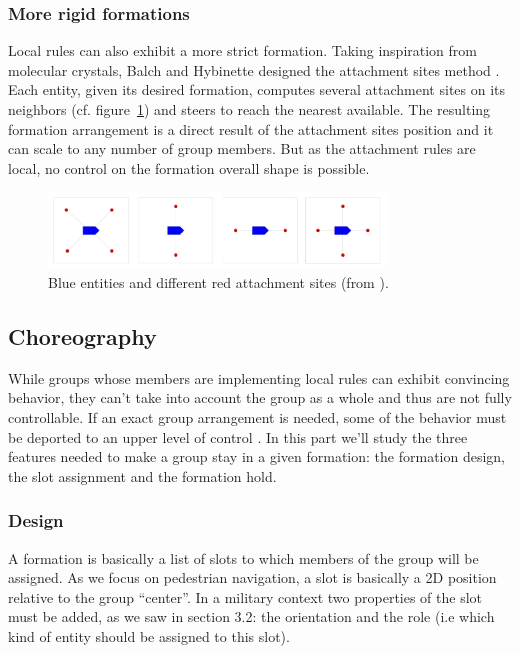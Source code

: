 \documentclass{article}
\begin{document}
\subsubsection{More rigid formations}
Local rules can also exhibit a more strict formation. Taking inspiration from molecular crystals, Balch and Hybinette designed the attachment sites method \cite{Balch:2000bn}. Each entity, given its desired formation, computes several attachment sites on its neighbors (cf. figure~\ref{fig:attachment_sites}) and steers to reach the nearest available. The resulting formation arrangement is a direct result of the attachment sites position and it can scale to any number of group members. But as the attachment rules are local, no control on the formation overall shape is possible. 

\begin{figure}[htb]
\centering
\includegraphics[width=0.8\textwidth]{AttachmentSites.jpg}
\caption{Blue entities and different red attachment sites (from \cite{Balch:2000bn}).}
\label{fig:attachment_sites}
\end{figure} 

\subsection{Choreography}

While groups whose members are implementing local rules can exhibit convincing behavior, they can’t take into account the group as a whole and thus are not fully controllable. If an exact group arrangement is needed, some of the behavior must be deported to an upper level of control \cite{MusTha2001}. In this part we’ll study the three features needed to make a group stay in a given formation: the formation design, the slot assignment and the formation hold.

\subsubsection{Design}

A formation is basically a list of slots to which members of the group will be assigned. As we focus on pedestrian navigation, a slot is basically a 2D position relative to the group “center”. In a military context two properties of the slot must be added, as we saw in section 3.2: the orientation and the role (i.e which kind of entity should be assigned to this slot).
\end{document}
